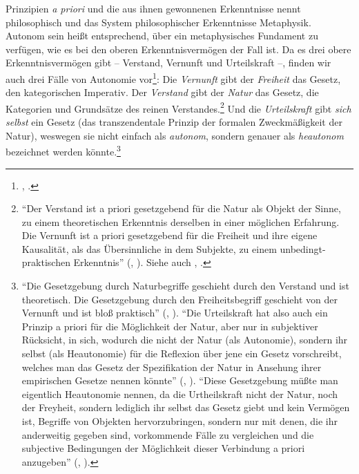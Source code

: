 Prinzipien \emph{a priori} und die aus ihnen gewonnenen Erkenntnisse nennt
 philosophisch und das System
philosophischer Erkenntnisse Metaphysik. Autonom sein heißt entsprechend, über
ein metaphysisches Fundament zu verfügen, wie es bei den oberen
Erkenntnisvermögen der Fall ist. Da es drei obere Erkenntnisvermögen gibt --
Verstand, Vernunft und Urteilskraft --, finden wir auch drei Fälle von Autonomie
vor\footnote{\cite[Vgl.][32]{Kant:ErsteEinleitungindieenquoteKritikderUrteilskraft2009},
\cite[][XX: 225.21--32]{Kant:GesammelteWerke1900ff.}.}: Die \textit{Vernunft}
gibt der \emph{Freiheit} das Gesetz, den kategorischen Imperativ.
Der \emph{Verstand} gibt der \emph{Natur} das Gesetz, die Kategorien und
Grundsätze des reinen Verstandes.\footnote{\enquote{Der Verstand ist a priori
gesetzgebend für die Natur als Objekt der Sinne, zu einem theoretischen
Erkenntnis derselben in einer möglichen Erfahrung. Die Vernunft ist a priori
gesetzgebend für die Freiheit und ihre eigene Kausalität, als das Übersinnliche
in dem Subjekte, zu einem unbedingt-praktischen Erkenntnis}
\mkbibparens{\cite[][B liii]{Kant:KritikderUrteilskraft2009},
\cite[][V: 195.4--8]{Kant:GesammelteWerke1900ff.}}.
Siehe auch \cite[][B xi--xiii]{Kant:KritikderUrteilskraft2009}, \cite[][V:
171.4--172.22]{Kant:GesammelteWerke1900ff.}.} Und die \emph{Urteilskraft} gibt
\emph{sich selbst} ein Gesetz (das transzendentale Prinzip der formalen
Zweckmäßigkeit der Natur), weswegen sie nicht einfach als \emph{autonom},
sondern genauer als \emph{heautonom} bezeichnet werden
könnte.\footnote{\enquote{Die Gesetzgebung
durch Naturbegriffe geschieht durch den Verstand und ist theoretisch. Die Gesetzgebung
durch den Freiheitsbegriff geschieht von der Vernunft und ist bloß praktisch}
\mkbibparens{\cite[][B xvii]{Kant:KritikderUrteilskraft2009},
\cite[][V: 174.32--34]{Kant:GesammelteWerke1900ff.}}. \enquote{Die Urteilskraft hat also auch ein Prinzip a priori
für die Möglichkeit der Natur, aber nur in subjektiver Rücksicht, in sich, wodurch die nicht der Natur (als Autonomie),
sondern ihr selbst (als Heautonomie) für die Reflexion über jene ein Gesetz
vorschreibt, welches man das Gesetz der Spezifikation der Natur in Ansehung
ihrer empirischen Gesetze nennen könnte} \mkbibparens{\cite[][B
xxxvii]{Kant:KritikderUrteilskraft2009}, \cite[][V:
185.35--186.3]{Kant:GesammelteWerke1900ff.}}.
\enquote{Diese Gesetzgebung müßte man eigentlich Heautonomie nennen, da die
Urtheilskraft nicht der Natur, noch der Freyheit, sondern lediglich ihr selbst
das Gesetz giebt und kein Vermögen ist, Begriffe von Objekten hervorzubringen,
sondern nur mit denen, die ihr anderweitig gegeben sind, vorkommende Fälle zu
vergleichen und die subjective Bedingungen der Möglichkeit dieser Verbindung a
priori anzugeben}
\mkbibparens{\cite[][32]{Kant:ErsteEinleitungindieenquoteKritikderUrteilskraft2009},
\cite[][XX: 225.27--32]{Kant:GesammelteWerke1900ff.}}.}



